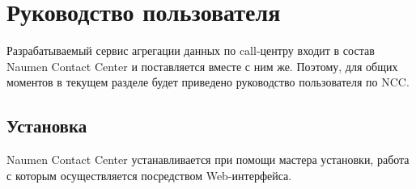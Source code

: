\chapter{Руководство пользователя} %
\label{ch:usrmanual}

Разрабатываемый сервис агрегации данных по call-центру входит в состав Naumen Contact Center и поставляется вместе с ним же.
Поэтому, для общих моментов в текущем разделе будет приведено руководство пользователя по NCC\@.

\section{Установка}


%
%
%

Naumen Contact Center устанавливается при помощи мастера установки, работа с которым осуществляется посредством Web-интерфейса.

